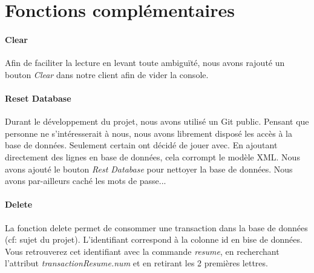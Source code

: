 \documentclass{article}
\begin{document}
  \newpage
  \section{Fonctions complémentaires}
    \paragraph{Clear}
      Afin de faciliter la lecture en levant toute ambiguïté, nous avons rajouté un bouton \emph{Clear} dans
      notre client afin de vider la console.
    \paragraph{Reset Database}
      Durant le développement du projet, nous avons utilisé un Git public. Pensant que personne ne s'intéresserait à nous,
      nous avons librement disposé les accès à la base de données. Seulement certain ont décidé de jouer avec. 
      En ajoutant directement des lignes en base de données, cela corrompt le modèle XML. Nous avons ajouté le bouton
      \emph{Rest Database} pour nettoyer la base de données. Nous avons par-ailleurs caché les mots de passe...
    \paragraph{Delete}
      La fonction delete permet de consommer une transaction dans la base de données (cf: sujet du projet).
      L'identifiant correspond à la colonne id en bise de données. Vous retrouverez cet identifiant avec la commande \emph{resume},
      en recherchant l'attribut \emph{transactionResume.num} et en retirant les 2 premières lettres.
\end{document}
